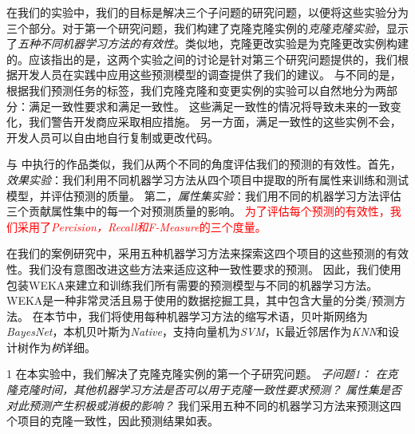 在我们的实验中，我们的目标是解决三个子问题的研究问题，以便将这些实验分为三个部分。对于第一个研究问题，我们构建了克隆克隆实例的{\em 克隆克隆实验}，显示了{\em 五种不同机器学习方法的有效性}。类似地，克隆更改实验是为克隆更改实例构建的。应该指出的是，这两个实验之间的讨论是针对第三个研究问题提供的，我们根据开发人员在实践中应用这些预测模型的调查提供了我们的建议。
与不同的是，根据我们预测任务的标签，我们克隆克隆和变更实例的实验可以自然地分为两部分：满足一致性要求和满足一致性。
这些满足一致性的情况将导致未来的一致变化，我们警告开发商应采取相应措施。
另一方面，满足一致性的这些实例不会，开发人员可以自由地自行复制或更改代码。

与\cite{wang2014predicting} \cite{zhang2016predicting}中执行的作品类似，我们从两个不同的角度评估我们的预测的有效性。首先，{\em  效果实验\/}：我们利用不同机器学习方法从四个项目中提取的所有属性来训练和测试模型，并评估预测的质量。
第二，{\em 属性集实验\/}：我们用不同的机器学习方法评估三个贡献属性集中的每一个对预测质量的影响。
\textcolor{red}{为了评估每个预测的有效性，我们采用了{\em Percision，Recall和F-Measure}的三个度量。}

在我们的案例研究中，采用五种机器学习方法来探索这四个项目的这些预测的有效性。我们没有意图改进这些方法来适应这种一致性要求的预测。
因此，我们使用包装WEKA来建立和训练我们所有需要的预测模型与不同的机器学习方法。WEKA是一种非常灵活且易于使用的数据挖掘工具，其中包含大量的分类/预测方法\cite{hall2009weka}。
在本节中，我们将使用每种机器学习方法的缩写术语，贝叶斯网络为{\em BayesNet}，本机贝叶斯为{\em Native}，支持向量机为{\em SVM}，K最近邻居作为{\em KNN}和设计树作为{\em 树}详细。

{1}
在本实验中，我们解决了克隆克隆实例的第一个子研究问题。
{\em {子问题1：}
在克隆克隆时间，其他机器学习方法是否可以用于克隆一致性要求预测？
属性集是否对此预测产生积极或消极的影响？}
我们采用五种不同的机器学习方法来预测这四个项目的克隆一致性，因此预测结果如表。

